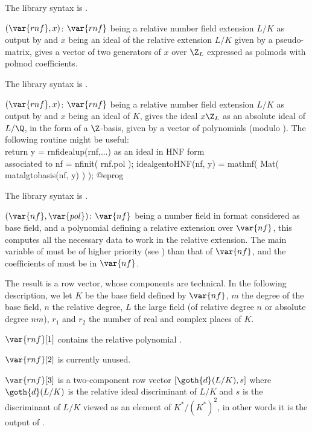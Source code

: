 The library syntax is .

$(\var{rnf},x)$: \label{se:rnfidealtwoelt}$\var{rnf}$ being a relative
number field extension $L/K$ as output by  and $x$ being an
ideal of the relative extension $L/K$ given by a pseudo-matrix, gives a
vector of two generators of $x$ over $\Z_L$ expressed as polmods with polmod
coefficients.

The library syntax is .

$(\var{rnf},x)$: \label{se:rnfidealup}$\var{rnf}$ being a relative number
field extension $L/K$ as output by  and $x$ being an ideal of
$K$, gives the ideal $x\Z_L$ as an absolute ideal of $L/\Q$, in the form of a
$\Z$-basis, given by a vector of polynomials (modulo ).
The following routine might be useful:
\bprog
\\ return y = rnfidealup(rnf,...) as an ideal in HNF form
\\ associated to nf = nfinit( rnf.pol );
idealgentoHNF(nf, y) = mathnf( Mat( matalgtobasis(nf, y) ) );
@eprog

The library syntax is .

$(\var{nf},\var{pol})$: \label{se:rnfinit}$\var{nf}$ being a number field in 
format considered as base field, and  a polynomial defining a relative
extension over $\var{nf}$, this computes all the necessary data to work in the
relative extension. The main variable of  must be of higher priority
(see ) than that of $\var{nf}$, and the coefficients of
 must be in $\var{nf}$.

The result is a row vector, whose components are technical. In the following
description, we let $K$ be the base field defined by $\var{nf}$, $m$ the
degree of the base field, $n$ the relative degree, $L$ the large field (of
relative degree $n$ or absolute degree $nm$), $r_1$ and $r_2$ the number of
real and complex places of $K$.

$\var{rnf}[1]$ contains the relative polynomial .

$\var{rnf}[2]$ is currently unused.

$\var{rnf}[3]$ is a two-component row vector $[\goth{d}(L/K),s]$ where
$\goth{d}(L/K)$ is the relative ideal discriminant of $L/K$ and $s$ is the
discriminant of $L/K$ viewed as an element of $K^*/(K^*)^2$, in other words
it is the output of .


